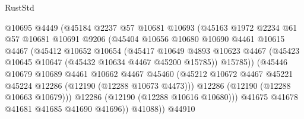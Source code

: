 \begin{lexlean}{RustStd}
\begin{coremodule}
                              @10695
                              @4449
                              (@45184
                                @2237
                                @57
                                @10681
                                @10693
                                (@45163
                                  @1972
                                  @2234
                                  @61
                                  @57
                                  @10681
                                  @10691
                                  @9206
                                  (@45404
                                    @10656
                                    @10680
                                    @10690
                                    @4461
                                    @10615
                                    @4467
                                    (@45412
                                      @10652
                                      @10654
                                      (@45417
                                        @10649
                                        @4893
                                        @10623
                                        @4467
                                        (@45423 @10645 @10647 (@45432 @10634 @4467 @45200 @15785))
                                        @15785))
                                    (@45446
                                      @10679
                                      @10689
                                      @4461
                                      @10662
                                      @4467
                                      @45460
                                      (@45212
                                        @10672
                                        @4467
                                        @45221
                                        @45224
                                        @12286
                                        (@12190 (@12288 @10673 @4473)))
                                      @12286
                                      (@12190 (@12288 @10663 @10679)))
                                    @12286
                                    (@12190 (@12288 @10616 @10680)))
                                  @41675
                                  @41678
                                  @41681
                                  @41685
                                  @41690
                                  @41696))
                              @41088))
                          @44910

\end{coremodule}
\end{lexlean}
